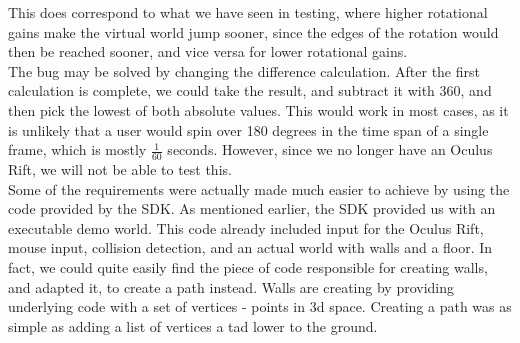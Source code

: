 This does correspond to what we have seen in testing, where higher rotational gains make the virtual world jump sooner, since the edges of the rotation would then be reached sooner, and vice versa for lower rotational gains. \\
The bug may be solved by changing the difference calculation.
After the first calculation is complete, we could take the result, and subtract it with 360, and then pick the lowest of both absolute values.
This would work in most cases, as it is unlikely that a user would spin over 180 degrees in the time span of a single frame, which is mostly $\frac{1}{60}$ seconds.
However, since we no longer have an Oculus Rift, we will not be able to test this. \\

Some of the requirements were actually made much easier to achieve by using the code provided by the SDK.
As mentioned earlier, the SDK provided us with an executable demo world. 
This code already included input for the Oculus Rift, mouse input, collision detection, and an actual world with walls and a floor.
In fact, we could quite easily find the piece of code responsible for creating walls, and adapted it, to create a path instead.
Walls are creating by providing underlying code with a set of vertices - points in 3d space.
Creating a path was as simple as adding a list of vertices a tad lower to the ground.

